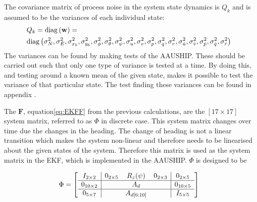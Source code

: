 The covariance matrix of process noise in the system state dynamics is $Q_k$ and is assumed to be the variances of each individual state:
\begin{align}
&Q_k = \mathrm{diag}\left(\mathbf{w}\right) = \\ \nonumber
&\mathrm{diag}\left(\sigma_{N}^2, \sigma_{E}^2, \sigma_{x_{b}}^2, \sigma_{y_{b}}^2, \sigma_{\phi}^2, \sigma_{\theta}^2, \sigma_{\psi}^2, \sigma_{u}^2, \sigma_{v}^2, \sigma_{p}^2, \sigma_{q}^2, \sigma_{r}^2, \sigma_{\dot u}^2, \sigma_{\dot v}^2, \sigma_{\dot p}^2, \sigma_{\dot q}^2, \sigma_{\dot r}^2\right)
\end{align} 
The variances can be found by making tests of the AAUSHIP. These should be carried out such that only one type of variance is tested at a time. By doing this, and testing around a known mean of the given state, makes it possible to test the variance of that particular state. The test finding these variances can be found in appendix .

The $\mathbf F$, equation\ref{eq:EKFF} from the previous calculations, are the $[17 \times 17]$ system matrix, referred to as $\Phi$ in discrete case. This system matrix changes over time due the changes in the heading. The change of heading is not a linear transition which makes the system non-linear and therefore needs to be linearised about the given states of the system. Therefore this matrix is used as the system matrix in the \ac{EKF}, which is implemented in the AAUSHIP. $\Phi$ is designed to be

 
\begin{align}
\Phi = 
  \left[\begin{array}{c|ccc|c}
    I_{2\times 2} & 0_{2\times 5} & R_z (\psi) & 0_{2\times 3} & 0_{2\times 5}\\ \hline
    0_{10\times2}  & \multicolumn{3}{c}{\multirow{1}{*}{{$A_d$}}} \vline&  0_{10\times 5} \\ \hline
    0_{5\times 7} & & A_{d[6:10]} & & I_{5\times 5}
  \end{array}\right]
\end{align}
